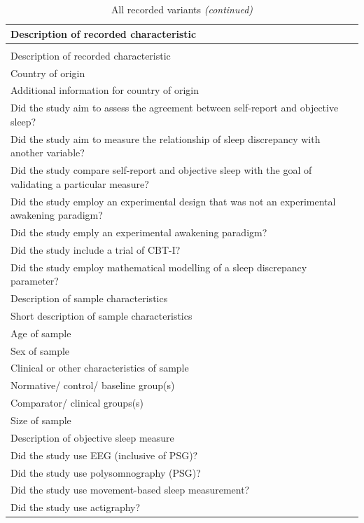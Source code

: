 \documentclass[
]{article}
\begin{document}
\begin{longtable}[t]{l}
\caption{\label{tab:allvariants}All recorded variants}\\
\toprule
Description of recorded characteristic\\
\midrule
\endfirsthead
\caption[]{\label{tab:allvariants}All recorded variants \textit{(continued)}}\\
\toprule
Description of recorded characteristic\\
\midrule
\endhead

\endfoot
\bottomrule
\endlastfoot
Country of origin\\
Additional information for country of origin\\
Did the study aim to assess the agreement between self-report and objective sleep?\\
Did the study aim to measure the relationship of sleep discrepancy with another variable?\\
Did the study compare self-report and objective sleep with the goal of validating a particular measure?\\
\addlinespace
Did the study employ an experimental design that was not an experimental awakening paradigm?\\
Did the study emply an experimental awakening paradigm?\\
Did the study include a trial of CBT-I?\\
Did the study employ mathematical modelling of a sleep discrepancy parameter?\\
Description of sample characteristics\\
\addlinespace
Short description of sample characteristics\\
Age of sample\\
Sex of sample\\
Clinical or other characteristics of sample\\
Normative/ control/ baseline group(s)\\
\addlinespace
Comparator/ clinical groups(s)\\
Size of sample\\
Description of objective sleep measure\\
Did the study use EEG (inclusive of PSG)?\\
Did the study use polysomnography (PSG)?\\
\addlinespace
Did the study use movement-based sleep measurement?\\
Did the study use actigraphy?\\

\end{longtable}
\end{document}
